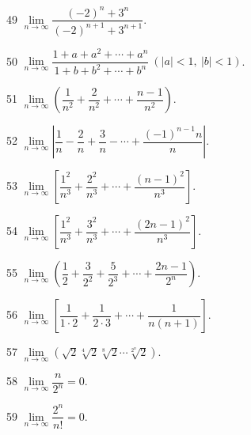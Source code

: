 \begin{prob}[S]{49}
$\lim\limits_{n\to\infty} \dfrac{(-2)^n + 3^n}{(-2)^{n+1} + 3^{n+1}}$.
\end{prob}

\begin{prob}[S]{50}
$\lim\limits_{n\to\infty} \dfrac{1 + a + a^2 + \cdots + a^n}{1 + b + b^2 + \cdots + b^n}\ (|a|<1,\ |b|<1)$.
\end{prob}

\begin{prob}[S]{51}
$\lim\limits_{n\to\infty} \left(\dfrac{1}{n^2} + \dfrac{2}{n^2} + \cdots + \dfrac{n-1}{n^2}\right)$.
\end{prob}

\begin{prob}[S]{52}
$\lim\limits_{n\to\infty} \left|\dfrac{1}{n} - \dfrac{2}{n} + \dfrac{3}{n} - \cdots + \dfrac{(-1)^{n-1}n}{n}\right|$.
\end{prob}

\begin{prob}[S]{53}
$\lim\limits_{n\to\infty} \left[\dfrac{1^2}{n^3} + \dfrac{2^2}{n^3} + \cdots + \dfrac{(n-1)^2}{n^3}\right]$.
\end{prob}

\begin{prob}[S]{54}
$\lim\limits_{n\to\infty} \left[\dfrac{1^2}{n^3} + \dfrac{3^2}{n^3} + \cdots + \dfrac{(2n-1)^2}{n^3}\right]$.
\end{prob}

\begin{prob}[S]{55}
$\lim\limits_{n\to\infty} \left(\dfrac{1}{2} + \dfrac{3}{2^2} + \dfrac{5}{2^3} + \cdots + \dfrac{2n-1}{2^n}\right)$.
\end{prob}

\begin{prob}[S]{56}
$\lim\limits_{n\to\infty} \left[\dfrac{1}{1\cdot 2} + \dfrac{1}{2\cdot 3} + \cdots + \dfrac{1}{n(n+1)}\right]$.
\end{prob}

\begin{prob}[S]{57}
$\lim\limits_{n\to\infty} \left(\sqrt{2}\sqrt[4]{2}\sqrt[8]{2}\cdots\sqrt[2^n]{2}\right)$.
\end{prob}


\begin{prob}[M]{58}
$\lim\limits_{n\to\infty} \dfrac{n}{2^n} = 0$.
\end{prob}

\begin{prob}[M]{59}
$\lim\limits_{n\to\infty} \dfrac{2^n}{n!} = 0$.
\end{prob}

